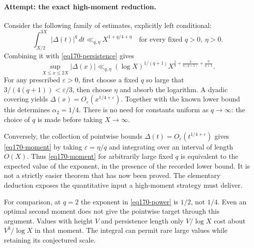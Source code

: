 \documentclass[11pt,a4paper]{article}
\newcommand{\eps}{\varepsilon}
\numberwithin{equation}{section}
\begin{document}
\paragraph{Attempt: the exact high-moment reduction.}
Consider the following family of estimates, explicitly left conditional:
\begin{equation}\label{eq170-moment}
 \int_{X/2}^{3X}|\Delta(t)|^q\,dt
       \ll_{q,\eta}X^{1+q/4+\eta}
       \quad\text{for every fixed }q>0,\ \eta>0.
\end{equation}
Combining it with \eqref{eq170-persistence} gives
\begin{equation}\label{eq170-power}
 \sup_{X\le x\le2X}|\Delta(x)|
 \ll_{q,\eta}(\log X)^{1/(q+1)}
 X^{\frac14+\frac{3}{4(q+1)}+\frac{\eta}{q+1}}.
\end{equation}
For any prescribed $\eps>0$, first choose a fixed $q$ so large that
$3/(4(q+1))<\eps/3$, then choose $\eta$ and absorb the logarithm.
A dyadic covering yields $\Delta(x)=O_\eps(x^{1/4+\eps})$.
Together with the known lower bound this determines $\alpha_2=1/4$.
There is no need for constants uniform as $q\to\infty$: the choice of $q$
is made before taking $X\to\infty$.

Conversely, the collection of pointwise bounds
$\Delta(t)=O_\eps(t^{1/4+\eps})$ gives \eqref{eq170-moment} by taking
$\eps=\eta/q$ and integrating over an interval of length $O(X)$.
Thus \eqref{eq170-moment} for arbitrarily large fixed $q$ is equivalent to
the expected value of the exponent, in the presence of the recorded lower
bound. It is not a strictly easier theorem that has now been proved.
The elementary deduction exposes the quantitative input a high-moment
strategy must deliver.

For comparison, at $q=2$ the exponent in \eqref{eq170-power} is $1/2$,
not $1/4$. Even an optimal second moment does not give the pointwise target
through this argument. Values with height $V$ and persistence length only
$V/\log X$ cost about $V^3/\log X$ in that moment. The integral can permit
rare large values while retaining its conjectured scale.
\end{document}
